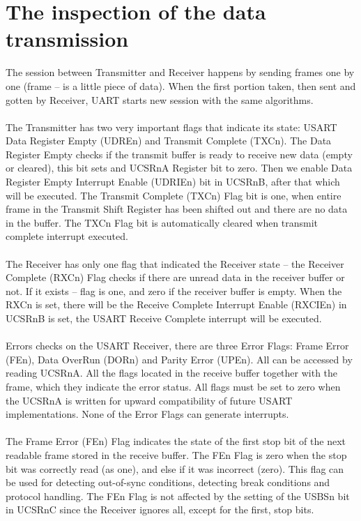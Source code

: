 \documentclass[english]{article}
\begin{document}
\section{The inspection of the data transmission}
The session between Transmitter and Receiver happens by sending frames one by one (frame – is a little piece of data). When the first portion taken, then sent and gotten by Receiver, UART starts new session with the same algorithms. \\\\
The Transmitter has two very important flags that indicate its state: USART Data Register Empty (UDREn) and Transmit Complete (TXCn). The Data Register Empty checks if the transmit buffer is ready to receive new data (empty or cleared), this bit sets and UCSRnA Register bit to zero. Then we enable Data Register Empty Interrupt Enable (UDRIEn) bit in UCSRnB, after that which will be executed. The Transmit Complete (TXCn) Flag bit is one, when entire frame in the Transmit Shift Register has been shifted out and there are no data in the buffer. The TXCn Flag bit is automatically cleared when transmit complete interrupt executed.\\\\
The Receiver has only one flag that indicated the Receiver state – the Receiver Complete (RXCn) Flag checks if there are unread data in the receiver buffer or not. If it exists – flag is one, and zero if the receiver buffer is empty. When the RXCn is set, there will be the Receive Complete Interrupt Enable (RXCIEn) in UCSRnB is set, the USART Receive Complete interrupt will be executed.\\\\
Errors checks on the USART Receiver, there are three Error Flags: Frame Error (FEn), Data OverRun (DORn) and Parity Error (UPEn). All can be accessed by reading UCSRnA.  All the flags located in the receive buffer together with the frame, which they indicate the error status. All flags must be set to zero when the UCSRnA is written for upward compatibility of future USART implementations. None of the Error Flags can generate interrupts.\\\\
The Frame Error (FEn) Flag indicates the state of the first stop bit of the next readable frame stored in the receive buffer. The FEn Flag is zero when the stop bit was correctly read (as one), and else if it was incorrect (zero). This flag can be used for detecting out-of-sync conditions, detecting break conditions and protocol handling. The FEn Flag is not affected by the setting of the USBSn bit in UCSRnC since the Receiver ignores all, except for the first, stop bits. \\\\
\end{document}
